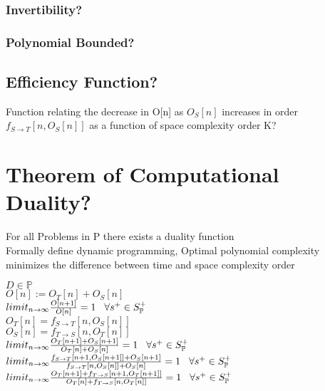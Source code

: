 \documentclass[11pt]{article}
\begin{document}
\subsubsection{Invertibility?}
\subsubsection{Polynomial Bounded?}




\subsection{Efficiency Function?}
Function relating the decrease in O[n] as $O_S[n]$ increases in order\\
$f_{S \rightarrow T}[n,O_S[n]]$ as a function of space complexity order K?


\section{Theorem of Computational Duality?}
For all Problems in P there exists a duality function\\
Formally define dynamic programming, Optimal polynomial complexity minimizes the difference between time and space complexity order
\begin{center}
\vspace{2mm}
$
D \in \mathbb{P}
$
\\ \vspace{2mm}
$
O[n] := O_T[n] + O_S[n]
$
\\ \vspace{2mm}
$
limit_{n \rightarrow \infty} \frac{O[n+1]}{O[n]} = 1 \hspace{3mm} \forall s^+ \in S_{\mathbb{P}}^+
$
\\ \vspace{7mm}
$
O_T[n] = f_{S \rightarrow T}[n,O_S[n]]
$
\\ \vspace{2mm}
$
O_S[n] = f_{T \rightarrow S}[n,O_T[n]]
$
\\ \vspace{7mm}
$
limit_{n \rightarrow \infty} \frac{O_T[n+1] + O_S[n+1]}{O_T[n] + O_S[n]} = 1 \hspace{3mm} \forall s^+ \in S_{\mathbb{P}}^+
$
\\ \vspace{7mm}
$
limit_{n \rightarrow \infty} \frac{ f_{S \rightarrow T}[n+1,O_S[n+1]] + O_S[n+1]}{ f_{S \rightarrow T}[n,O_S[n]] + O_S[n]} = 1 \hspace{3mm} \forall s^+ \in S_{\mathbb{P}}^+
$
\\ \vspace{3mm}
$
limit_{n \rightarrow \infty} \frac{O_T[n+1] + f_{T \rightarrow S}[n+1,O_T[n+1]]}{O_T[n] + f_{T \rightarrow S}[n,O_T[n]]} = 1 \hspace{3mm} \forall s^+ \in S_{\mathbb{P}}^+
$
\end{center}
\end{document}
